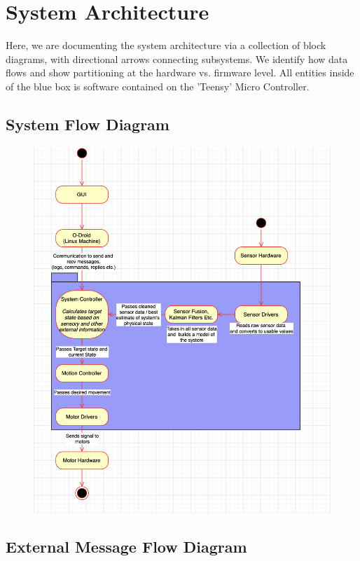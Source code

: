 \section{System Architecture}
Here, we are documenting the system architecture via a collection of block diagrams, with directional arrows connecting subsystems. We identify how data flows and show partitioning at the hardware vs. firmware level. All entities inside of the blue box is software contained on the 'Teensy' Micro Controller.

\subsection{System Flow Diagram}

\begin{figure}[h!]
\centering
\includegraphics[scale=0.56]{./images/system_flow}
\end{figure}

\newpage
\subsection{External Message Flow Diagram}

